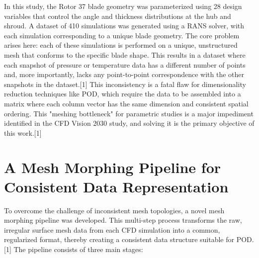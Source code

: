 \documentclass[12pt, a4paper]{report}
\begin{document}
In this study, the Rotor 37 blade geometry was parameterized using 28 design variables that control the angle and thickness distributions at the hub and shroud. A dataset of 410 simulations was generated using a RANS solver, with each simulation corresponding to a unique blade geometry. The core problem arises here: each of these simulations is performed on a unique, unstructured mesh that conforms to the specific blade shape. This results in a dataset where each snapshot of pressure or temperature data has a different number of points and, more importantly, lacks any point-to-point correspondence with the other snapshots in the dataset.[1] This inconsistency is a fatal flaw for dimensionality reduction techniques like POD, which require the data to be assembled into a matrix where each column vector has the same dimension and consistent spatial ordering. This "meshing bottleneck" for parametric studies is a major impediment identified in the CFD Vision 2030 study, and solving it is the primary objective of this work.[1]

\section{A Mesh Morphing Pipeline for Consistent Data Representation}

To overcome the challenge of inconsistent mesh topologies, a novel mesh morphing pipeline was developed. This multi-step process transforms the raw, irregular surface mesh data from each CFD simulation into a common, regularized format, thereby creating a consistent data structure suitable for POD.[1] The pipeline consists of three main stages:
\end{document}
